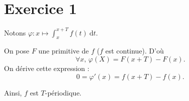 \part{Exercice 1}

Notons $\varphi : x \mapsto \int_{x}^{x+T} f(t)~\mathrm{d}t$.

On pose $F$ une primitive de $f$ ($f$ est continue). D'où \[
	\forall x,\,\varphi(X) = F(x+T) - F(x)
.\] On dérive cette expression : \[
	0 = \varphi'(x) = f(x+T) - f(x)
.\]

Ainsi, $f$ est $T$-périodique.

